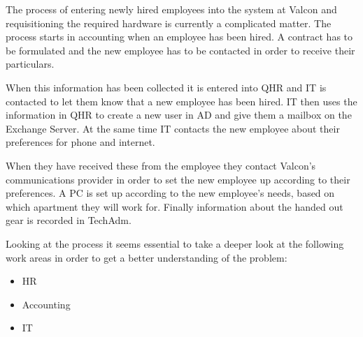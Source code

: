 The process of entering newly hired employees into the system at Valcon 
and requisitioning the required hardware is currently a complicated matter.
The process starts in accounting when an employee has been hired.
A contract has to be formulated and the new employee has to be contacted in order to receive their particulars.

When this information has been collected it is entered into QHR and IT is contacted to let them know that a new employee has been hired.
IT then uses the information in QHR to create a new user in AD and give them a mailbox on the Exchange Server.
At the same time IT contacts the new employee about their preferences for phone and internet.

When they have received these from the employee they contact Valcon's communications provider in order to set the new employee up according to their preferences.
A PC is set up according to the new employee's needs, based on which apartment they will work for.
Finally information about the handed out gear is recorded in TechAdm.

Looking at the process it seems essential to take a deeper look at the following work areas in order to get a better understanding of the problem:
\begin{itemize}
\item HR
\item Accounting
\item IT
\end{itemize}
